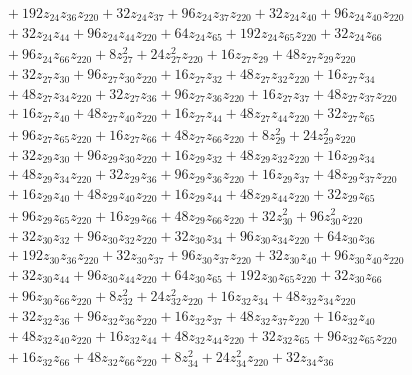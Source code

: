 \documentclass[11pt]{article}
\theoremstyle{remark}
\begin{document}
\begin{align*}
&\quad{}+192z_{24} z_{36} z_{220}+32z_{24} z_{37}+96z_{24} z_{37} z_{220}+32z_{24} z_{40}+96z_{24} z_{40} z_{220}\\
&\quad{}+32z_{24} z_{44}+96z_{24} z_{44} z_{220}+64z_{24} z_{65}+192z_{24} z_{65} z_{220}+32z_{24} z_{66}\\
&\quad{}+96z_{24} z_{66} z_{220}+8z_{27}^{2}+24z_{27}^{2} z_{220}+16z_{27} z_{29}+48z_{27} z_{29} z_{220}\\
&\quad{}+32z_{27} z_{30}+96z_{27} z_{30} z_{220}+16z_{27} z_{32}+48z_{27} z_{32} z_{220}+16z_{27} z_{34}\\
&\quad{}+48z_{27} z_{34} z_{220}+32z_{27} z_{36}+96z_{27} z_{36} z_{220}+16z_{27} z_{37}+48z_{27} z_{37} z_{220}\\
&\quad{}+16z_{27} z_{40}+48z_{27} z_{40} z_{220}+16z_{27} z_{44}+48z_{27} z_{44} z_{220}+32z_{27} z_{65}\\
&\quad{}+96z_{27} z_{65} z_{220}+16z_{27} z_{66}+48z_{27} z_{66} z_{220}+8z_{29}^{2}+24z_{29}^{2} z_{220}\\
&\quad{}+32z_{29} z_{30}+96z_{29} z_{30} z_{220}+16z_{29} z_{32}+48z_{29} z_{32} z_{220}+16z_{29} z_{34}\\
&\quad{}+48z_{29} z_{34} z_{220}+32z_{29} z_{36}+96z_{29} z_{36} z_{220}+16z_{29} z_{37}+48z_{29} z_{37} z_{220}\\
&\quad{}+16z_{29} z_{40}+48z_{29} z_{40} z_{220}+16z_{29} z_{44}+48z_{29} z_{44} z_{220}+32z_{29} z_{65}\\
&\quad{}+96z_{29} z_{65} z_{220}+16z_{29} z_{66}+48z_{29} z_{66} z_{220}+32z_{30}^{2}+96z_{30}^{2} z_{220}\\
&\quad{}+32z_{30} z_{32}+96z_{30} z_{32} z_{220}+32z_{30} z_{34}+96z_{30} z_{34} z_{220}+64z_{30} z_{36}\\
&\quad{}+192z_{30} z_{36} z_{220}+32z_{30} z_{37}+96z_{30} z_{37} z_{220}+32z_{30} z_{40}+96z_{30} z_{40} z_{220}\\
&\quad{}+32z_{30} z_{44}+96z_{30} z_{44} z_{220}+64z_{30} z_{65}+192z_{30} z_{65} z_{220}+32z_{30} z_{66}\\
&\quad{}+96z_{30} z_{66} z_{220}+8z_{32}^{2}+24z_{32}^{2} z_{220}+16z_{32} z_{34}+48z_{32} z_{34} z_{220}\\
&\quad{}+32z_{32} z_{36}+96z_{32} z_{36} z_{220}+16z_{32} z_{37}+48z_{32} z_{37} z_{220}+16z_{32} z_{40}\\
&\quad{}+48z_{32} z_{40} z_{220}+16z_{32} z_{44}+48z_{32} z_{44} z_{220}+32z_{32} z_{65}+96z_{32} z_{65} z_{220}\\
&\quad{}+16z_{32} z_{66}+48z_{32} z_{66} z_{220}+8z_{34}^{2}+24z_{34}^{2} z_{220}+32z_{34} z_{36}\\

\end{align*}
\end{document}
